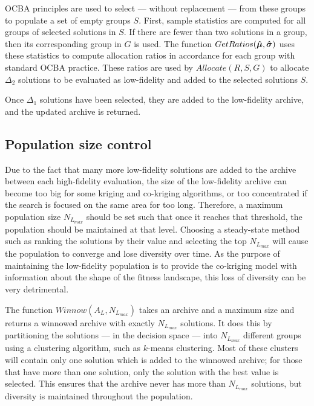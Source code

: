 OCBA principles are used to select --- without replacement --- from these groups to populate a set of empty groups $S$. First, sample statistics are computed for all groups of selected solutions in $S$. If there are fewer than two solutions in a group, then its corresponding group in $G$ is used. The function $GetRatios(\boldsymbol{\hat{\mu}},\boldsymbol{\hat{\sigma}})$ uses these statistics to compute allocation ratios in accordance for each group with standard OCBA practice. These ratios are used by $Allocate(R,S,G)$ to allocate $\Delta_2$ solutions to be evaluated as low-fidelity and added to the selected solutions $S$.

Once $\Delta_1$ solutions have been selected, they are added to the low-fidelity archive, and the updated archive is returned.

\subsection{Population size control}
Due to the fact that many more low-fidelity solutions are added to the archive between each high-fidelity evaluation, the size of the low-fidelity archive can become too big for some kriging and co-kriging algorithms, or too concentrated if the search is focused on the same area for too long. Therefore, a maximum population size $N_{L_{max}}$ should be set such that once it reaches that threshold, the population should be maintained at that level. Choosing a steady-state method such as ranking the solutions by their value and selecting the top $N_{L_{max}}$ will cause the population to converge and lose diversity over time. As the purpose of maintaining the low-fidelity population is to provide the co-kriging model with information about the shape of the fitness landscape, this loss of diversity can be very detrimental. 

The function $Winnow(A_L,N_{L_{max}})$  takes an archive and a maximum size and returns a winnowed archive with exactly $N_{L_{max}}$ solutions. It does this by partitioning the solutions --- in the decision space --- into $N_{L_{max}}$ different groups using a clustering algorithm, such as $k$-means clustering. Most of these clusters will contain only one solution which is added to the winnowed archive; for those that have more than one solution, only the solution with the best value is selected. This ensures that the archive never has more than $N_{L_{max}}$ solutions, but diversity is maintained throughout the population.

